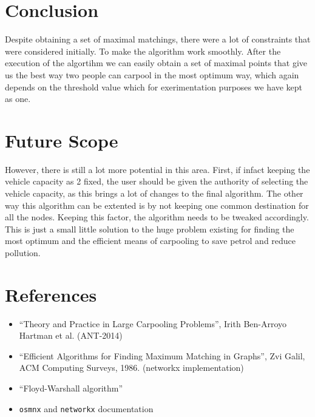 \documentclass[main.tex]{subfiles}
\begin{document}
\section{Conclusion}
Despite obtaining a set of maximal matchings, there were a lot of constraints
that were considered initially. To make the algorithm work smoothly. After the
execution of the algortihm we can easily obtain a set of maximal points that
give us the best way two people can carpool in the most optimum way, which again
depends on the threshold value which for exerimentation purposes we have kept as
one.
\section{Future Scope}
However, there is still a lot more potential in this area.  First, if infact
keeping the vehicle capacity as 2 fixed, the user should be given the authority
of selecting the vehicle capacity, as this brings a lot of changes to the final
algorithm.  The other way this algorithm can be extented is by not keeping one
common destination for all the nodes. Keeping this factor, the algorithm needs
to be tweaked accordingly.  This is just a small little solution to the huge
problem existing for finding the most optimum and the efficient means of
carpooling to save petrol and reduce pollution.

\section{References}
\begin{itemize}
  \item ``Theory and Practice in Large Carpooling Problems'', Irith Ben-Arroyo
    Hartman et al. (ANT-2014)
  \item ``Efficient Algorithms for Finding Maximum Matching in Graphs'', Zvi
    Galil, ACM Computing Surveys, 1986. (networkx implementation)
  \item ``Floyd-Warshall algorithm''
  \item \texttt{osmnx} and \texttt{networkx} documentation
\end{itemize}
\end{document}
